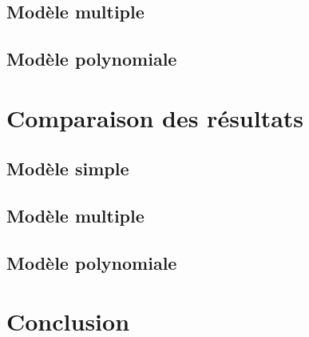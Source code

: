 \documentclass[french]{article}
\begin{document}
\subsection{Modèle multiple}


\subsection{Modèle polynomiale}

\newpage

\section{Comparaison des résultats}
\subsection{Modèle simple}

\subsection{Modèle multiple}

\subsection{Modèle polynomiale}

\newpage

\section{Conclusion}
\end{document}
